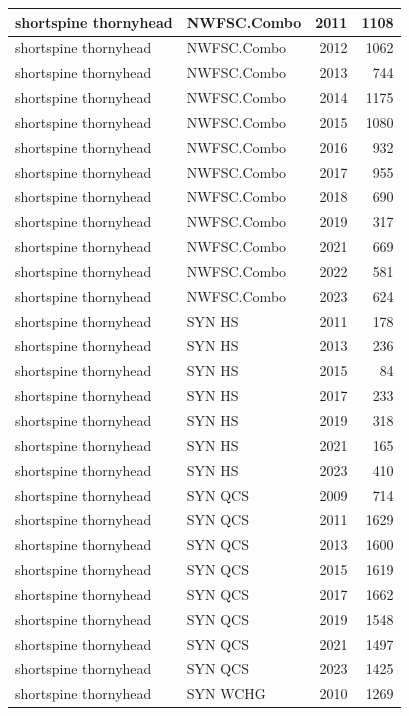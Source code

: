\documentclass[
  letterpaper,
  DIV=11,
  numbers=noendperiod]{scrartcl}
\begin{document}
\begin{tabular}[t]{l|l|r|r}
\hline
shortspine thornyhead & NWFSC.Combo & 2011 & 1108\\
\hline
shortspine thornyhead & NWFSC.Combo & 2012 & 1062\\
\hline
shortspine thornyhead & NWFSC.Combo & 2013 & 744\\
\hline
shortspine thornyhead & NWFSC.Combo & 2014 & 1175\\
\hline
shortspine thornyhead & NWFSC.Combo & 2015 & 1080\\
\hline
shortspine thornyhead & NWFSC.Combo & 2016 & 932\\
\hline
shortspine thornyhead & NWFSC.Combo & 2017 & 955\\
\hline
shortspine thornyhead & NWFSC.Combo & 2018 & 690\\
\hline
shortspine thornyhead & NWFSC.Combo & 2019 & 317\\
\hline
shortspine thornyhead & NWFSC.Combo & 2021 & 669\\
\hline
shortspine thornyhead & NWFSC.Combo & 2022 & 581\\
\hline
shortspine thornyhead & NWFSC.Combo & 2023 & 624\\
\hline
shortspine thornyhead & SYN HS & 2011 & 178\\
\hline
shortspine thornyhead & SYN HS & 2013 & 236\\
\hline
shortspine thornyhead & SYN HS & 2015 & 84\\
\hline
shortspine thornyhead & SYN HS & 2017 & 233\\
\hline
shortspine thornyhead & SYN HS & 2019 & 318\\
\hline
shortspine thornyhead & SYN HS & 2021 & 165\\
\hline
shortspine thornyhead & SYN HS & 2023 & 410\\
\hline
shortspine thornyhead & SYN QCS & 2009 & 714\\
\hline
shortspine thornyhead & SYN QCS & 2011 & 1629\\
\hline
shortspine thornyhead & SYN QCS & 2013 & 1600\\
\hline
shortspine thornyhead & SYN QCS & 2015 & 1619\\
\hline
shortspine thornyhead & SYN QCS & 2017 & 1662\\
\hline
shortspine thornyhead & SYN QCS & 2019 & 1548\\
\hline
shortspine thornyhead & SYN QCS & 2021 & 1497\\
\hline
shortspine thornyhead & SYN QCS & 2023 & 1425\\
\hline
shortspine thornyhead & SYN WCHG & 2010 & 1269\\

\end{tabular}
\end{document}
